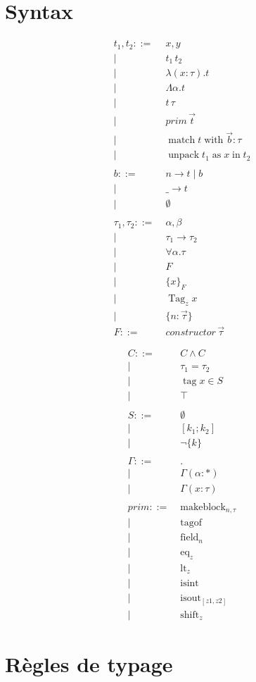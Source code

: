\documentclass{article}
\newcommand\term{t}
\newcommand\ty{\tau}
\newcommand\tyenv{\Gamma}
\newcommand\var{x}
\newcommand\tyvar{\alpha}
\newcommand\binding[2]{(#1 : #2)}
\newcommand\kw[1]{\operatorname{#1}}
\newcommand\syn[1]{#1 ::=& \; }
\newcommand\synor{\\ |& \; }
\begin{document}
\newcommand\pator{\;|\;}

\section{Syntax}

\begin{multicols}{2}
\begin{align*}
  \syn{\term_1, \term_2} \var, y
  \synor      \term_1 \, \term_2
  \synor      \lambda \binding{\var}{\ty} . \term
  \synor      \Lambda \tyvar . \term
  \synor      \term \, \ty
  \synor      prim \, \vec{\term}
  \synor      \kw{match} \term \kw{with} \vec{b} : \ty
  \synor      \kw{unpack} \term_1 \kw{as} \var \kw{in} \term_2
%
  \\ \\
%
  \syn{b} n \rightarrow \term \; | \; b
  \synor  \_ \rightarrow \term
  \synor  \emptyset
%
  \\ \\
%
  \syn{\ty_1, \ty_2} \tyvar, \beta
  \synor  \ty_1 \rightarrow \ty_2
  \synor  \forall \tyvar. \ty
  \synor  F
  \synor  \{ \var \}_F
  \synor  \kw{Tag}_z \var
  \synor  \{ n: \vec{\ty} \}
  \\
  \syn{F} constructor \, \vec{\ty}
\end{align*}
   
\begin{align*}
  \syn{C} C \wedge C
  \synor  \ty_1 = \ty_2
  \synor  \kw{tag} \var \in S
  \synor  \top
%
  \\ \\
%
  \syn{S} \emptyset
  \synor  [ k_1 ; k_2 ]
  \synor  \lnot \{ k \}
%
  \\ \\
%
  \syn{\tyenv} .
  \synor \tyenv \binding{\alpha}{*}
  \synor \tyenv \binding{\var}{\ty}
%
  \\ \\
%
  \syn{prim} \kw{makeblock}_{n,\ty}
  \synor \kw{tagof}
  \synor \kw{field}_{n}
  \synor \kw{eq}_{z}
  \synor \kw{lt}_{z}
  \synor \kw{isint}
  \synor \kw{isout}_{[z1,z2]}
  \synor \kw{shift}_{z}
\end{align*}
\end{multicols}

\section{Règles de typage}
\end{document}
